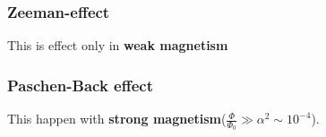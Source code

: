 \subsubsection{Zeeman-effect}
This is effect only in \textbf{weak magnetism}

\subsubsection{Paschen-Back effect}
This happen with \textbf{strong magnetism}($\frac{\Phi}{\Phi_0}\gg\alpha^2\sim10^{-4}$).
